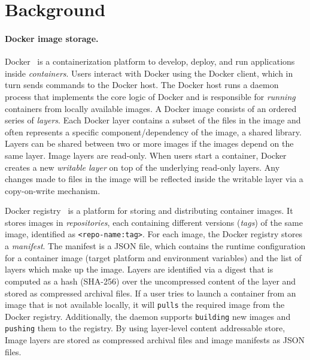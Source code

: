 \section{Background}
\label{sec:background}

\paragraph{Docker image storage.} Docker~\cite{docker} is a containerization
platform to develop, deploy, and run applications inside \emph{containers}.
Users interact with Docker using the Docker client, which in turn sends
commands to the Docker host.  The Docker host runs a daemon process that
implements the core logic of Docker and is responsible for \emph{running}
containers from locally available images.  A Docker image consists of an
ordered series of \emph{layers}.  Each Docker layer contains a subset of the
files in the image and often represents a specific component/dependency of the
image, \eg a shared library.  Layers can be shared between two or more images
if the images depend on the same layer.  Image layers are read-only.  When
users start a container, Docker creates a new \emph{writable layer} on top of
the underlying read-only layers.
Any changes made to files in the image will be reflected inside the writable
layer via a copy-on-write mechanism.

% 
%


Docker registry~\cite{docker-hub} is a platform for storing and distributing container
images. It stores images in \emph{repositories}, each containing different
versions (\emph{tags}) of the same image, identified as
\texttt{<repo-name:tag>}.  For each image, the Docker registry stores a
\emph{manifest}.
The manifest is a JSON file, which contains the runtime configuration for a
container image (\eg target platform and environment variables) and the list
of layers which make up the image.
Layers are identified via a digest that is computed as a hash (SHA-256) over
the uncompressed content of the layer and stored as compressed archival files.
If a user tries to launch a container from an image that is not available
locally, it will \texttt{pulls} the required image from the Docker registry.
Additionally, the daemon supports \texttt{building} new images and
\texttt{pushing} them to the registry.  By using layer-level content
addressable store, Image layers are stored as compressed archival files and
image manifests as JSON files.

